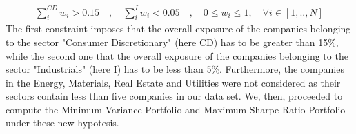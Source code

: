 \documentclass{assignment}
\begin{document}
\begin{align*}
    \sum_{i}^{CD}{w_{i}} > 0.15 \quad , \quad 
    \sum_{i}^{I}{w_{i}} < 0.05 \quad , \quad
    0\leq w_i \leq 1 ,\quad  \forall i\in \left [ 1,..,N \right ]  
\end{align*}
The first constraint imposes that the overall exposure of the companies belonging to the sector
"Consumer Discretionary" (here CD) has to be greater than 15\%, while the second one that the
overall exposure of the companies belonging to the sector "Industrials" (here I) has to be less
than 5\%.
Furthermore, the companies in the Energy, Materials, Real Estate and Utilities were not considered
as their sectors contain less than five companies in our data set. 
We, then, proceeded to compute the Minimum Variance Portfolio and Maximum Sharpe Ratio Portfolio
under these new hypotesis.
\end{document}
